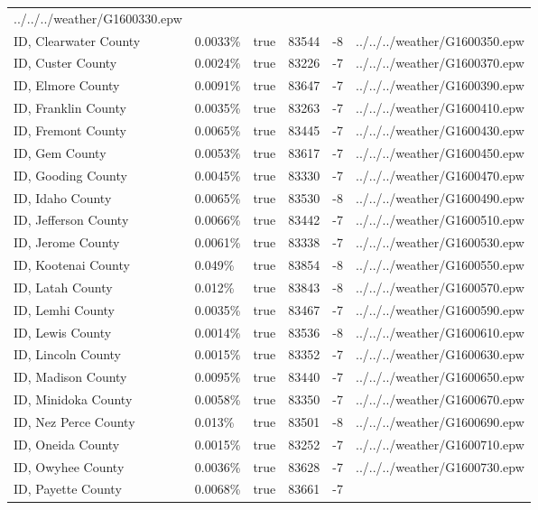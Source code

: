 \begin{longtable}[]{@{}llllll@{}}
../../../weather/G1600330.epw \\
ID, Clearwater County & 0.0033\% & true & 83544 & -8 &
../../../weather/G1600350.epw \\
ID, Custer County & 0.0024\% & true & 83226 & -7 &
../../../weather/G1600370.epw \\
ID, Elmore County & 0.0091\% & true & 83647 & -7 &
../../../weather/G1600390.epw \\
ID, Franklin County & 0.0035\% & true & 83263 & -7 &
../../../weather/G1600410.epw \\
ID, Fremont County & 0.0065\% & true & 83445 & -7 &
../../../weather/G1600430.epw \\
ID, Gem County & 0.0053\% & true & 83617 & -7 &
../../../weather/G1600450.epw \\
ID, Gooding County & 0.0045\% & true & 83330 & -7 &
../../../weather/G1600470.epw \\
ID, Idaho County & 0.0065\% & true & 83530 & -8 &
../../../weather/G1600490.epw \\
ID, Jefferson County & 0.0066\% & true & 83442 & -7 &
../../../weather/G1600510.epw \\
ID, Jerome County & 0.0061\% & true & 83338 & -7 &
../../../weather/G1600530.epw \\
ID, Kootenai County & 0.049\% & true & 83854 & -8 &
../../../weather/G1600550.epw \\
ID, Latah County & 0.012\% & true & 83843 & -8 &
../../../weather/G1600570.epw \\
ID, Lemhi County & 0.0035\% & true & 83467 & -7 &
../../../weather/G1600590.epw \\
ID, Lewis County & 0.0014\% & true & 83536 & -8 &
../../../weather/G1600610.epw \\
ID, Lincoln County & 0.0015\% & true & 83352 & -7 &
../../../weather/G1600630.epw \\
ID, Madison County & 0.0095\% & true & 83440 & -7 &
../../../weather/G1600650.epw \\
ID, Minidoka County & 0.0058\% & true & 83350 & -7 &
../../../weather/G1600670.epw \\
ID, Nez Perce County & 0.013\% & true & 83501 & -8 &
../../../weather/G1600690.epw \\
ID, Oneida County & 0.0015\% & true & 83252 & -7 &
../../../weather/G1600710.epw \\
ID, Owyhee County & 0.0036\% & true & 83628 & -7 &
../../../weather/G1600730.epw \\
ID, Payette County & 0.0068\% & true & 83661 & -7 &

\end{longtable}
